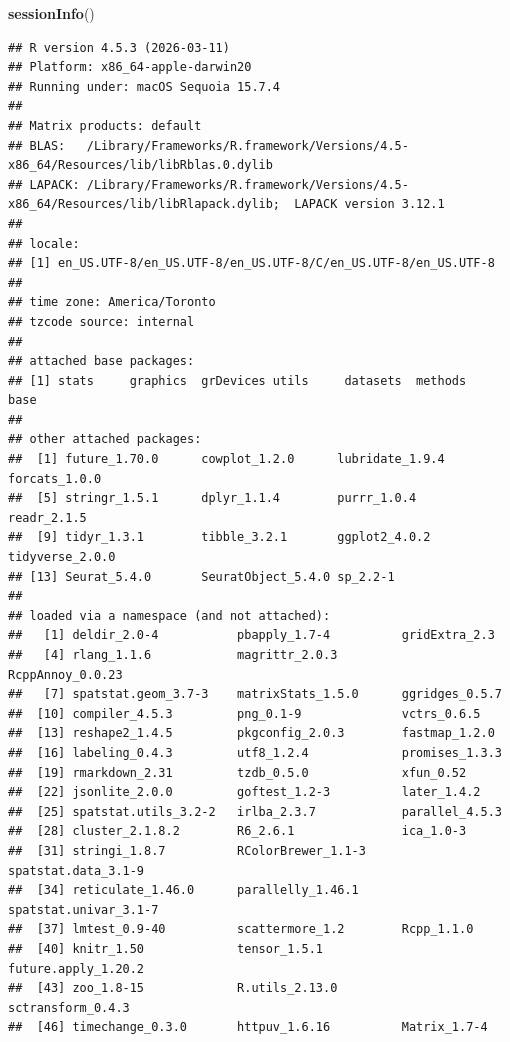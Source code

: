 \documentclass[
]{article}
\newenvironment{Shaded}{\begin{snugshade}}{\end{snugshade}}
\newcommand{\FunctionTok}[1]{\textcolor[rgb]{0.13,0.29,0.53}{\textbf{#1}}}
\newcommand{\NormalTok}[1]{#1}
\begin{document}
\begin{Shaded}
\begin{Highlighting}[]
\FunctionTok{sessionInfo}\NormalTok{()}
\end{Highlighting}
\end{Shaded}

\begin{verbatim}
## R version 4.5.3 (2026-03-11)
## Platform: x86_64-apple-darwin20
## Running under: macOS Sequoia 15.7.4
## 
## Matrix products: default
## BLAS:   /Library/Frameworks/R.framework/Versions/4.5-x86_64/Resources/lib/libRblas.0.dylib 
## LAPACK: /Library/Frameworks/R.framework/Versions/4.5-x86_64/Resources/lib/libRlapack.dylib;  LAPACK version 3.12.1
## 
## locale:
## [1] en_US.UTF-8/en_US.UTF-8/en_US.UTF-8/C/en_US.UTF-8/en_US.UTF-8
## 
## time zone: America/Toronto
## tzcode source: internal
## 
## attached base packages:
## [1] stats     graphics  grDevices utils     datasets  methods   base     
## 
## other attached packages:
##  [1] future_1.70.0      cowplot_1.2.0      lubridate_1.9.4    forcats_1.0.0     
##  [5] stringr_1.5.1      dplyr_1.1.4        purrr_1.0.4        readr_2.1.5       
##  [9] tidyr_1.3.1        tibble_3.2.1       ggplot2_4.0.2      tidyverse_2.0.0   
## [13] Seurat_5.4.0       SeuratObject_5.4.0 sp_2.2-1          
## 
## loaded via a namespace (and not attached):
##   [1] deldir_2.0-4           pbapply_1.7-4          gridExtra_2.3         
##   [4] rlang_1.1.6            magrittr_2.0.3         RcppAnnoy_0.0.23      
##   [7] spatstat.geom_3.7-3    matrixStats_1.5.0      ggridges_0.5.7        
##  [10] compiler_4.5.3         png_0.1-9              vctrs_0.6.5           
##  [13] reshape2_1.4.5         pkgconfig_2.0.3        fastmap_1.2.0         
##  [16] labeling_0.4.3         utf8_1.2.4             promises_1.3.3        
##  [19] rmarkdown_2.31         tzdb_0.5.0             xfun_0.52             
##  [22] jsonlite_2.0.0         goftest_1.2-3          later_1.4.2           
##  [25] spatstat.utils_3.2-2   irlba_2.3.7            parallel_4.5.3        
##  [28] cluster_2.1.8.2        R6_2.6.1               ica_1.0-3             
##  [31] stringi_1.8.7          RColorBrewer_1.1-3     spatstat.data_3.1-9   
##  [34] reticulate_1.46.0      parallelly_1.46.1      spatstat.univar_3.1-7 
##  [37] lmtest_0.9-40          scattermore_1.2        Rcpp_1.1.0            
##  [40] knitr_1.50             tensor_1.5.1           future.apply_1.20.2   
##  [43] zoo_1.8-15             R.utils_2.13.0         sctransform_0.4.3     
##  [46] timechange_0.3.0       httpuv_1.6.16          Matrix_1.7-4          

\end{verbatim}
\end{document}
